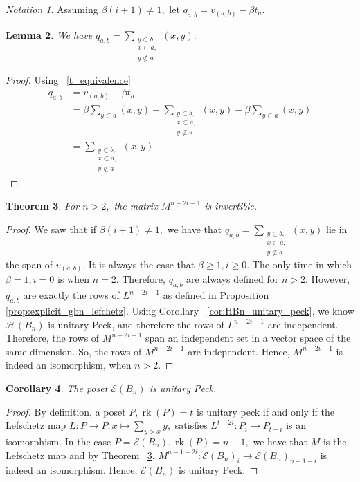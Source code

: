 \documentclass[10 pt]{amsart}
\theoremstyle{plain}
\newtheorem{thm}{Theorem}[section]
\newtheorem{lem}[thm]{Lemma}
\newtheorem{cor}[thm]{Corollary}
\theoremstyle{definition}
\theoremstyle{remark}
\newtheorem{note}[thm]{Notation}
\numberwithin{equation}{section}
\newcommand\rk{\operatorname{rk}}
\begin{document}
\begin{note}
Assuming $\beta(i+1) \neq 1,$ let $q_{a,b} = v_{(a, b)} - \beta t_a.$
\end{note}

\begin{lem}
We have $q_{a,b} = \sum_{\substack{{y\subset b,}\\{x \subset a,}\\{y\not\subset a}}}^{}(x, y).$
\end{lem}
\begin{proof}
Using ~\ref{t_equivalence}
\begin{align*}
  q_{a,b} &= v_{(a, b)} - \beta t_a \\
  &= \beta \sum_{y \subset a}^{}(x, y) + \sum_{\substack{{y\subset b,}\\{x \subset a,}\\{y\not\subset a}}}^{}(x, y) - \beta\sum_{y\subset a}^{}(x, y)\\
  &= \sum_{\substack{{y\subset b,}\\{x \subset a,}\\{y\not\subset a}}}^{}(x, y)
\end{align*}
\end{proof}

\begin{thm}
\label{thm:invertibility_lefschetz}
For $n >2,$ the matrix $M^{n-2i-1}$ is invertible.
\end{thm}
\begin{proof}
We saw that if $\beta(i+1) \neq 1,$ we have that $q_{a,b} = \sum_{\substack{{y\subset b,}\\{x \subset a,}\\{y\not\subset a}}}^{}(x, y)$ lie in the span of $v_{(a, b)}.$ It is always the case that $\beta \geq 1,i \geq 0.$ The only time in which $\beta = 1,i=0$ is when $n = 2.$ Therefore, $q_{a,b}$ are always defined for $n > 2.$ However, $q_{a,b}$ are exactly the rows of $L^{n-2i-1}$ as defined in Proposition \ref{prop:explicit_gbn_lefchetz}. Using Corollary ~\ref{cor:HBn_unitary_peck}, we know $\mathcal H(B_n)$ is unitary Peck, and therefore the rows of $L^{n-2i-1}$ are independent. Therefore, the rows of $M^{n-2i-1}$ span an independent set in a vector space of the same dimension. So, the rows of $M^{n-2i-1}$ are independent. Hence, $M^{n-2i-1}$ is indeed an isomorphism, when $n > 2.$
\end{proof}

\begin{cor}
\label{cor:unitary_peck_edge_bn}
The poset $\mathcal E(B_n)$ is unitary Peck.
\end{cor}
\begin{proof}
By definition, a poset $P,\rk(P) = t$ is unitary peck if and only if the Lefschetz map $L:P \rightarrow P,x \mapsto \sum_{y \gtrdot x} y,$ satisfies $L^{t-2i}:P_i \rightarrow P_{t-i}$ is an isomorphism. In the case $P = \mathcal E(B_n),\rk(P) = n-1,$ we have that $M$ is the Lefschetz map and by Theorem ~\ref{thm:invertibility_lefschetz}, $M^{n-1-2i}:\mathcal E(B_n)_i \rightarrow \mathcal E(B_n)_{n-1-i}$ is indeed an isomorphism. Hence, $\mathcal E(B_n)$ is unitary Peck.
\end{proof}
\end{document}
